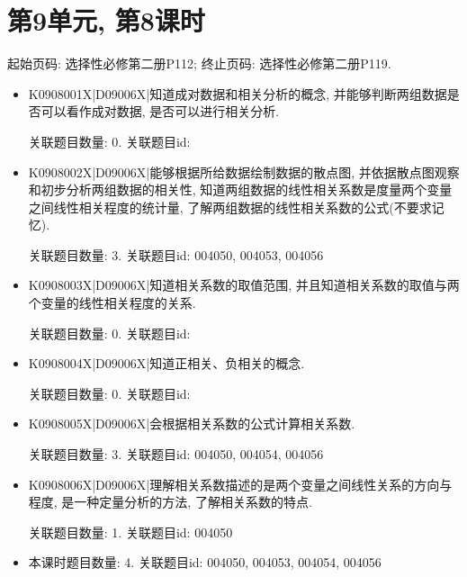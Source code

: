 \section*{第9单元, 第8课时}
起始页码: 选择性必修第二册P112; 终止页码: 选择性必修第二册P119.
\begin{itemize}
\item K0908001X|D09006X|知道成对数据和相关分析的概念, 并能够判断两组数据是否可以看作成对数据, 是否可以进行相关分析.

关联题目数量: 0. 关联题目id: 

\item K0908002X|D09006X|能够根据所给数据绘制数据的散点图, 并依据散点图观察和初步分析两组数据的相关性, 知道两组数据的线性相关系数是度量两个变量之间线性相关程度的统计量, 了解两组数据的线性相关系数的公式(不要求记忆).

关联题目数量: 3. 关联题目id: 004050, 004053, 004056

\item K0908003X|D09006X|知道相关系数的取值范围, 并且知道相关系数的取值与两个变量的线性相关程度的关系.

关联题目数量: 0. 关联题目id: 

\item K0908004X|D09006X|知道正相关、负相关的概念.

关联题目数量: 0. 关联题目id: 

\item K0908005X|D09006X|会根据相关系数的公式计算相关系数.

关联题目数量: 3. 关联题目id: 004050, 004054, 004056

\item K0908006X|D09006X|理解相关系数描述的是两个变量之间线性关系的方向与程度, 是一种定量分析的方法, 了解相关系数的特点.

关联题目数量: 1. 关联题目id: 004050

\item 本课时题目数量: 4. 关联题目id: 004050, 004053, 004054, 004056

\end{itemize}

